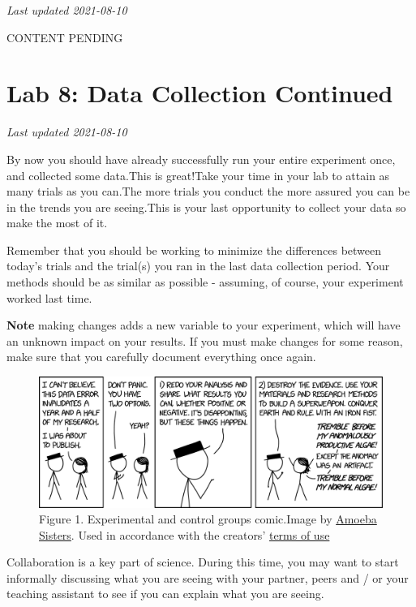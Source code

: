 \documentclass[
]{book}
\begin{document}
\emph{Last updated 2021-08-10}

CONTENT PENDING

\hypertarget{lab-8-data-collection-continued}{%
\chapter*{Lab 8: Data Collection Continued}\label{lab-8-data-collection-continued}}

\emph{Last updated 2021-08-10}

By now you should have already successfully run your entire experiment once, and collected some data.This is great!Take your time in your lab to attain as many trials as you can.The more trials you conduct the more assured you can be in the trends you are seeing.This is your last opportunity to collect your data so make the most of it.

Remember that you should be working to minimize the differences between today's trials and the trial(s) you ran in the last data collection period. Your methods should be as similar as possible - assuming, of course, your experiment worked last time.

\textbf{Note} making changes adds a new variable to your experiment, which will have an unknown impact on your results. If you must make changes for some reason, make sure that you carefully document everything once again.

\begin{figure}
\centering
\includegraphics{figures_images/Lab8-Fig1.png}
\caption{Figure 1. Experimental and control groups comic.Image by \href{https://www.amoebasisters.com/parameciumparlorcomics/category/nature-of-science/2}{Amoeba Sisters}. Used in accordance with the creators' \href{https://www.amoebasisters.com/termsofuse.html}{terms of use}}
\end{figure}

Collaboration is a key part of science. During this time, you may want to start informally discussing what you are seeing with your partner, peers and / or your teaching assistant to see if you can explain what you are seeing.
\end{document}
